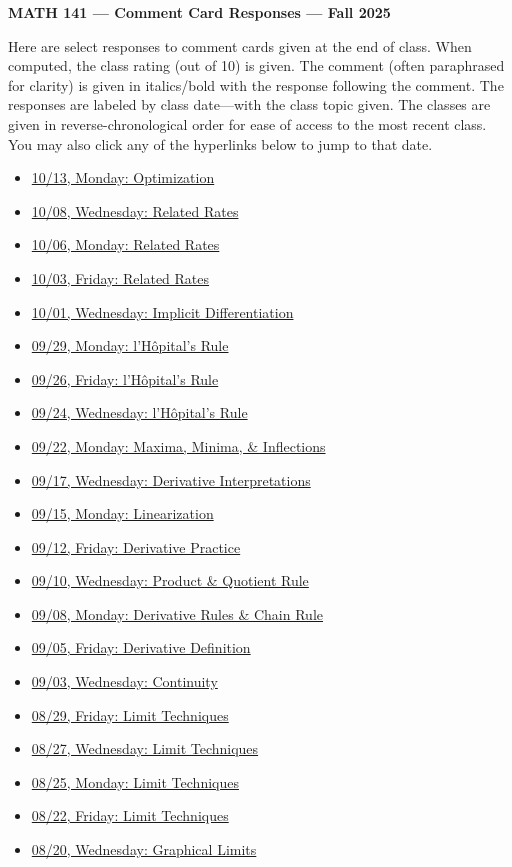 \documentclass[11pt,letterpaper]{article}
\begin{document}
\begin{center} {\bfseries \LARGE MATH 141 --- Comment Card Responses --- Fall 2025} \end{center}

Here are select responses to comment cards given at the end of class. When computed, the class rating (out of 10) is given. The comment (often paraphrased for clarity) is given in italics/bold with the response following the comment. The responses are labeled by class date---with the class topic given. The classes are given in reverse-chronological order for ease of access to the most recent class. You may also click any of the hyperlinks below to jump to that date.

\begin{itemize}
\item \hyperref[10-13]{10/13, Monday: Optimization}
\item \hyperref[10-08]{10/08, Wednesday: Related Rates}
\item \hyperref[10-06]{10/06, Monday: Related Rates}
\item \hyperref[10-03]{10/03, Friday: Related Rates}
\item \hyperref[10-01]{10/01, Wednesday: Implicit Differentiation}
\item \hyperref[09-29]{09/29, Monday: l'H\^{o}pital's Rule}
\item \hyperref[09-26]{09/26, Friday: l'H\^{o}pital's Rule}
\item \hyperref[09-24]{09/24, Wednesday: l'H\^{o}pital's Rule}
\item \hyperref[09-22]{09/22, Monday: Maxima, Minima, \& Inflections}
\item \hyperref[09-17]{09/17, Wednesday: Derivative Interpretations}
\item \hyperref[09-15]{09/15, Monday: Linearization}
\item \hyperref[09-12]{09/12,  Friday: Derivative Practice}
\item \hyperref[09-10]{09/10, Wednesday: Product \& Quotient Rule}
\item \hyperref[09-08]{09/08, Monday: Derivative Rules \& Chain Rule}
\item \hyperref[09-05]{09/05, Friday: Derivative Definition}
\item \hyperref[09-03]{09/03, Wednesday: Continuity}
\item \hyperref[08-29]{08/29, Friday: Limit Techniques}
\item \hyperref[08-27]{08/27, Wednesday: Limit Techniques}
\item \hyperref[08-25]{08/25, Monday: Limit Techniques}
\item \hyperref[08-22]{08/22, Friday: Limit Techniques}
\item \hyperref[08-20]{08/20, Wednesday: Graphical Limits}
\end{itemize}
\end{document}
